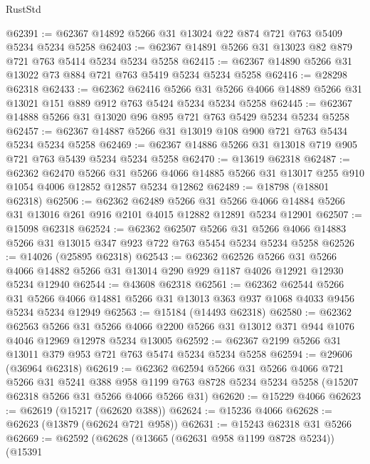 \begin{lexlean}{RustStd}
\begin{coremodule}
@62391 := @62367 @14892 @5266 @31 @13024 @22 @874 @721 @763 @5409 @5234 @5234 @5258
@62403 := @62367 @14891 @5266 @31 @13023 @82 @879 @721 @763 @5414 @5234 @5234 @5258
@62415 := @62367 @14890 @5266 @31 @13022 @73 @884 @721 @763 @5419 @5234 @5234 @5258
@62416 := @28298 @62318
@62433 := @62362
    @62416
    @5266
    @31
    @5266
    @4066
    @14889
    @5266
    @31
    @13021
    @151
    @889
    @912
    @763
    @5424
    @5234
    @5234
    @5258
@62445 := @62367 @14888 @5266 @31 @13020 @96 @895 @721 @763 @5429 @5234 @5234 @5258
@62457 := @62367 @14887 @5266 @31 @13019 @108 @900 @721 @763 @5434 @5234 @5234 @5258
@62469 := @62367 @14886 @5266 @31 @13018 @719 @905 @721 @763 @5439 @5234 @5234 @5258
@62470 := @13619 @62318
@62487 := @62362
    @62470
    @5266
    @31
    @5266
    @4066
    @14885
    @5266
    @31
    @13017
    @255
    @910
    @1054
    @4006
    @12852
    @12857
    @5234
    @12862
@62489 := @18798 (@18801 @62318)
@62506 := @62362
    @62489
    @5266
    @31
    @5266
    @4066
    @14884
    @5266
    @31
    @13016
    @261
    @916
    @2101
    @4015
    @12882
    @12891
    @5234
    @12901
@62507 := @15098 @62318
@62524 := @62362
    @62507
    @5266
    @31
    @5266
    @4066
    @14883
    @5266
    @31
    @13015
    @347
    @923
    @722
    @763
    @5454
    @5234
    @5234
    @5258
@62526 := @14026 (@25895 @62318)
@62543 := @62362
    @62526
    @5266
    @31
    @5266
    @4066
    @14882
    @5266
    @31
    @13014
    @290
    @929
    @1187
    @4026
    @12921
    @12930
    @5234
    @12940
@62544 := @43608 @62318
@62561 := @62362
    @62544
    @5266
    @31
    @5266
    @4066
    @14881
    @5266
    @31
    @13013
    @363
    @937
    @1068
    @4033
    @9456
    @5234
    @5234
    @12949
@62563 := @15184 (@14493 @62318)
@62580 := @62362
    @62563
    @5266
    @31
    @5266
    @4066
    @2200
    @5266
    @31
    @13012
    @371
    @944
    @1076
    @4046
    @12969
    @12978
    @5234
    @13005
@62592 := @62367 @2199 @5266 @31 @13011 @379 @953 @721 @763 @5474 @5234 @5234 @5258
@62594 := @29606 (@36964 @62318)
@62619 := @62362
    @62594
    @5266
    @31
    @5266
    @4066
    @721
    @5266
    @31
    @5241
    @388
    @958
    @1199
    @763
    @8728
    @5234
    @5234
    @5258
    (@15207 @62318 @5266 @31 @5266 @4066 @5266 @31)
@62620 := @15229 @4066
@62623 := @62619 (@15217 (@62620 @388))
@62624 := @15236 @4066
@62628 := @62623 (@13879 (@62624 @721 @958))
@62631 := @15243 @62318 @31 @5266
@62669 := @62592
    (@62628
      (@13665 (@62631 @958 @1199 @8728 @5234))
      (@15391

\end{coremodule}
\end{lexlean}
